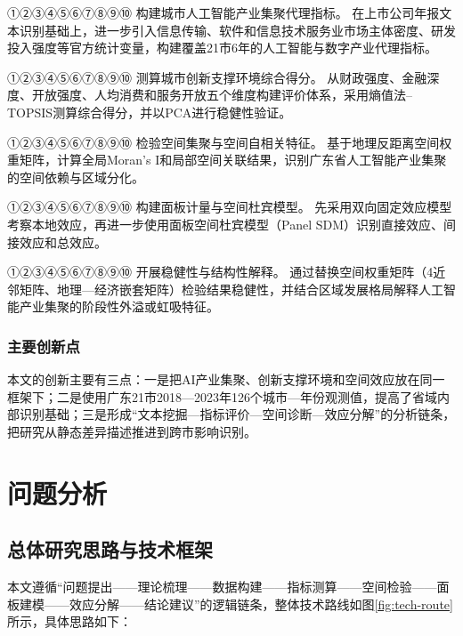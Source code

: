 \documentclass[12pt, a4paper]{ctexart}
\newcommand{\circlednum}[1]{%
    \mbox{{\papersymbolfont\ifcase#1\or ①\or ②\or ③\or ④\or ⑤\or ⑥\or ⑦\or ⑧\or ⑨\or ⑩\else #1\fi}}%
}
\newcommand{\one}{\circlednum{1}}
\newcommand{\two}{\circlednum{2}}
\newcommand{\three}{\circlednum{3}}
\newcommand{\four}{\circlednum{4}}
\newcommand{\five}{\circlednum{5}}
\begin{document}
{\songti \one 构建城市人工智能产业集聚代理指标。}
在上市公司年报文本识别基础上，进一步引入信息传输、软件和信息技术服务业市场主体密度、研发投入强度等官方统计变量，构建覆盖21市6年的人工智能与数字产业代理指标。

{\songti \two 测算城市创新支撑环境综合得分。}
从财政强度、金融深度、开放强度、人均消费和服务开放五个维度构建评价体系，采用熵值法--TOPSIS测算综合得分，并以PCA进行稳健性验证。

{\songti \three 检验空间集聚与空间自相关特征。}
基于地理反距离空间权重矩阵，计算全局Moran's I和局部空间关联结果，识别广东省人工智能产业集聚的空间依赖与区域分化。

{\songti \four 构建面板计量与空间杜宾模型。}
先采用双向固定效应模型考察本地效应，再进一步使用面板空间杜宾模型（Panel SDM）识别直接效应、间接效应和总效应。

{\songti \five 开展稳健性与结构性解释。}
通过替换空间权重矩阵（4近邻矩阵、地理—经济嵌套矩阵）检验结果稳健性，并结合区域发展格局解释人工智能产业集聚的阶段性外溢或虹吸特征。

\subsubsection{主要创新点}
本文的创新主要有三点：一是把AI产业集聚、创新支撑环境和空间效应放在同一框架下；二是使用广东21市2018—2023年126个城市—年份观测值，提高了省域内部识别基础；三是形成“文本挖掘—指标评价—空间诊断—效应分解”的分析链条，把研究从静态差异描述推进到跨市影响识别。



\section{问题分析}

\subsection{总体研究思路与技术框架}
本文遵循“问题提出——理论梳理——数据构建——指标测算——空间检验——面板建模——效应分解——结论建议”的逻辑链条，整体技术路线如图\ref{fig:tech-route}所示，具体思路如下：
\end{document}
